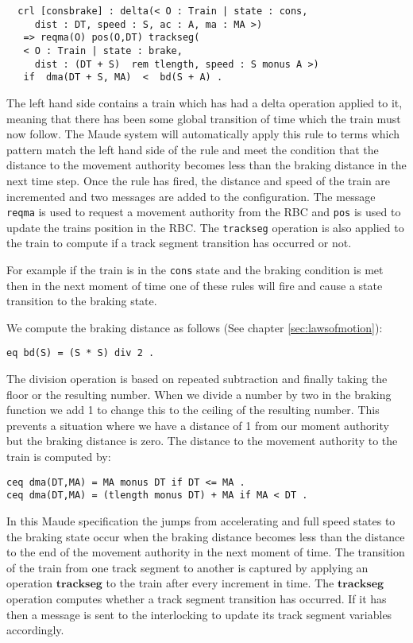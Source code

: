 \begin{lstlisting}
  crl [consbrake] : delta(< O : Train | state : cons, 
     dist : DT, speed : S, ac : A, ma : MA >)   
   => reqma(O) pos(O,DT) trackseg(
   < O : Train | state : brake, 
     dist : (DT + S)  rem tlength, speed : S monus A >)    
   if  dma(DT + S, MA)  <  bd(S + A) .
\end{lstlisting}

The left hand side contains a train which has had a delta operation applied to it, meaning that there has been some global transition of time which the train must now follow. The Maude system will automatically apply this rule to terms which pattern match the left hand side of the rule and meet the condition that the distance to the movement authority becomes less than the braking distance in the next time step. Once the rule has fired, the distance and speed of the train are incremented and two messages are added to the configuration. The message \texttt{reqma} is used to request a movement authority from the RBC and \texttt{pos} is used to update the trains position in the RBC. The \texttt{trackseg} operation is also applied to the train to compute if a track segment transition has occurred or not. 

For example if the train is in the \texttt{cons} state and the braking condition is met then in the next moment of time one of these rules will fire and cause a state transition to the braking state. 

We compute the braking distance as follows (See chapter \ref{sec:lawsofmotion}): 
\begin{center}\texttt{eq bd(S) = (S * S) div 2 .}\end{center}


The division operation is based on repeated subtraction and finally taking the floor or the resulting number. When we divide a number by two in the braking function we add 1 to change this to the ceiling of the resulting number. This prevents a situation where we have a distance of 1 from our moment authority but the braking distance is zero.
The distance to the movement authority to the train is computed by:
\begin{center}
\texttt{ceq dma(DT,MA) = MA monus DT if DT <= MA .} \\
\texttt{ceq dma(DT,MA) = (tlength monus DT) + MA if MA < DT .}
\end{center}

In this Maude specification the jumps from accelerating and full speed states to the braking state occur when the braking distance becomes less than the distance to the end of the movement authority in the next moment of time.  The transition of the train from one track segment to another is captured by applying an operation $\textbf{trackseg}$ to the train after every increment in time. The $\textbf{trackseg}$ operation computes whether a track segment transition has occurred. If it has then a message is sent to the interlocking to update its track segment variables accordingly.

